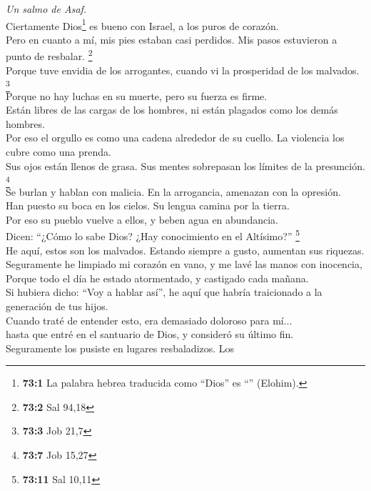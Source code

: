 \emph{Un salmo de Asaf.}\\
 Ciertamente Dios\footnote{\textbf{73:1} La palabra hebrea
  traducida como ``Dios'' es ``'' (Elohim).} es bueno con
Israel, a los puros de corazón.\\
 Pero en cuanto a mí, mis pies estaban casi perdidos. Mis
pasos estuvieron a punto de resbalar. \footnote{\textbf{73:2} Sal 94,18}\\
 Porque tuve envidia de los arrogantes, cuando vi la
prosperidad de los malvados. \footnote{\textbf{73:3} Job 21,7}\\
 Porque no hay luchas en su muerte, pero su fuerza es
firme.\\
 Están libres de las cargas de los hombres, ni están
plagados como los demás hombres.\\
 Por eso el orgullo es como una cadena alrededor de su
cuello. La violencia los cubre como una prenda.\\
 Sus ojos están llenos de grasa. Sus mentes sobrepasan los
límites de la presunción. \footnote{\textbf{73:7} Job 15,27}\\
 Se burlan y hablan con malicia. En la arrogancia,
amenazan con la opresión.\\
 Han puesto su boca en los cielos. Su lengua camina por la
tierra.\\
 Por eso su pueblo vuelve a ellos, y beben agua en
abundancia.\\
 Dicen: ``¿Cómo lo sabe Dios? ¿Hay conocimiento en el
Altísimo?'' \footnote{\textbf{73:11} Sal 10,11}\\
 He aquí, estos son los malvados. Estando siempre a
gusto, aumentan sus riquezas.\\
 Seguramente he limpiado mi corazón en vano, y me lavé
las manos con inocencia,\\
 Porque todo el día he estado atormentado, y castigado
cada mañana.\\
 Si hubiera dicho: ``Voy a hablar así'', he aquí que
habría traicionado a la generación de tus hijos.\\
 Cuando traté de entender esto, era demasiado doloroso
para mí...\\
 hasta que entré en el santuario de Dios, y consideró su
último fin.\\
 Seguramente los pusiste en lugares resbaladizos. Los
